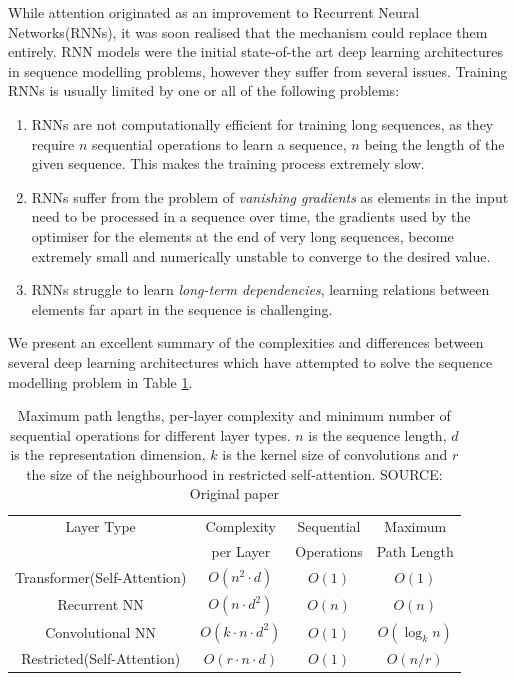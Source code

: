While attention originated as an improvement to Recurrent Neural Networks(RNNs), it was soon realised that the mechanism could replace them entirely\cite{vaswaniAttentionAllYou2017}. RNN models were the initial state-of-the art deep learning architectures in sequence modelling problems, however they suffer from several issues. Training RNNs is usually limited by one or all of the following problems:
\begin{enumerate}
\item RNNs are not computationally efficient for training long sequences, as they require $n$ sequential operations to learn a sequence, $n$ being the length of the given sequence. This makes the training process extremely slow.
\item RNNs suffer from the problem of \emph{vanishing gradients} \ie as elements in the input need to be processed in a sequence over time, the gradients used by the optimiser\cite{Robbins2007ASA} for the elements at the end of very long sequences, become extremely small and numerically unstable to converge to the desired value.
\item RNNs struggle to learn \emph{long-term dependencies}, \ie learning relations between elements far apart in the sequence is challenging.
\end{enumerate}

We present an excellent summary of the complexities and differences between several deep learning architectures which have attempted to solve the sequence modelling problem in Table \ref{bg:table1}.

\begin{table}[htbp]
\centering
\begin{tabular}{ c   c   c  c  }
\toprule
Layer Type & Complexity   & Sequential   & Maximum \\
& per Layer & Operations & Path Length \\
\midrule
Transformer(Self-Attention) & $O(n^2 \cdot d)$ & $O(1)$ & $O(1)$ \\
Recurrent NN & $O(n \cdot d^2)$ & $O(n)$ & $O(n)$ \\
Convolutional NN & $O(k \cdot n \cdot d^2)$ & $O(1)$ & $O(\log_{k}{n})$\\
Restricted(Self-Attention) & $O(r \cdot n \cdot d)$ & $O(1)$ & $O(n/r)$\\
\bottomrule
\end{tabular}
\caption{Maximum path lengths, per-layer complexity and minimum number of sequential operations
for different layer types. $n$ is the sequence length, $d$ is the representation dimension, $k$ is the kernel
size of convolutions and $r$ the size of the neighbourhood in restricted self-attention.
SOURCE: Original paper\cite{vaswaniAttentionAllYou2017}}
\label{bg:table1}
\end{table}


